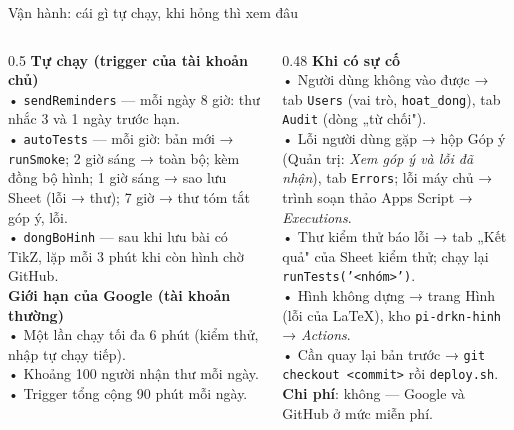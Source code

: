 \documentclass[aspectratio=169,11pt]{beamer}
\newcommand\sm[1]{{\fontsize{6.6}{8.2}\selectfont #1}}
\begin{document}
\begin{frame}{Vận hành: cái gì tự chạy, khi hỏng thì xem đâu}
\begin{columns}[T]
\begin{column}{0.5\textwidth}\sm{%
\textbf{Tự chạy (trigger của tài khoản chủ)}\\
• \texttt{sendReminders} — mỗi ngày 8 giờ: thư nhắc 3 và 1 ngày trước hạn.\\
• \texttt{autoTests} — mỗi giờ: bản mới → \texttt{runSmoke}; 2 giờ sáng → toàn bộ; kèm đồng bộ hình; 1 giờ sáng → sao lưu Sheet (lỗi → thư); 7 giờ → thư tóm tắt góp ý, lỗi.\\
• \texttt{dongBoHinh} — sau khi lưu bài có TikZ, lặp mỗi 3 phút khi còn hình chờ GitHub.\\[2mm]
\textbf{Giới hạn của Google (tài khoản thường)}\\
• Một lần chạy tối đa 6 phút (kiểm thử, nhập tự chạy tiếp).\\
• Khoảng 100 người nhận thư mỗi ngày.\\
• Trigger tổng cộng 90 phút mỗi ngày.}
\end{column}
\begin{column}{0.48\textwidth}\sm{%
\textbf{Khi có sự cố}\\
• Người dùng không vào được → tab \texttt{Users} (vai trò, \texttt{hoat\_dong}), tab \texttt{Audit} (dòng „từ chối").\\
• Lỗi người dùng gặp → hộp Góp ý (Quản trị: \emph{Xem góp ý và lỗi đã nhận}), tab \texttt{Errors}; lỗi máy chủ → trình soạn thảo Apps Script → \emph{Executions}.\\
• Thư kiểm thử báo lỗi → tab „Kết quả" của Sheet kiểm thử; chạy lại \texttt{runTests('<nhóm>')}.\\
• Hình không dựng → trang Hình (lỗi của LaTeX), kho \texttt{pi-drkn-hinh} → \emph{Actions}.\\
• Cần quay lại bản trước → \texttt{git checkout <commit>} rồi \texttt{deploy.sh}.\\[2mm]
\textbf{Chi phí}: không — Google và GitHub ở mức miễn phí.}
\end{column}
\end{columns}
\end{frame}
\end{document}
